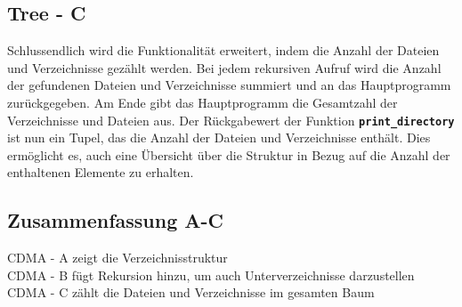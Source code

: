 \subsection*{Tree - C}
Schlussendlich wird die Funktionalität erweitert, indem die Anzahl der Dateien und Verzeichnisse gezählt werden. Bei jedem rekursiven Aufruf wird die Anzahl der gefundenen Dateien und Verzeichnisse summiert und an das Hauptprogramm zurückgegeben. Am Ende gibt das Hauptprogramm die Gesamtzahl der Verzeichnisse und Dateien aus. Der Rückgabewert der Funktion \textbf{\texttt{print\_directory}} ist nun ein Tupel, das die Anzahl der Dateien und Verzeichnisse enthält. Dies ermöglicht es, auch eine Übersicht über die Struktur in Bezug auf die Anzahl der enthaltenen Elemente zu erhalten.
\begin{codeblock}
    
\end{codeblock}

\subsection*{Zusammenfassung A-C}
CDMA - A \quad zeigt die Verzeichnisstruktur\\
CDMA - B \quad fügt Rekursion hinzu, um auch Unterverzeichnisse darzustellen\\
CDMA - C \quad zählt die Dateien und Verzeichnisse im gesamten Baum